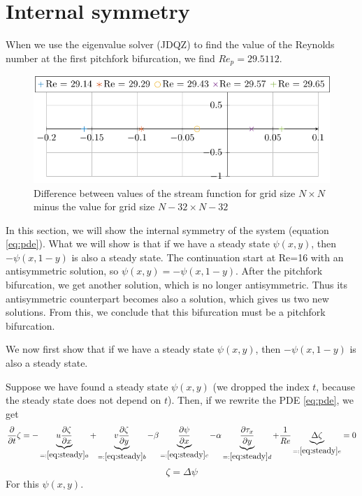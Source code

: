 \section{Internal symmetry}
When we use the eigenvalue solver (JDQZ) to find the value of the Reynolds number at the first pitchfork bifurcation, we find $Re_p=29.5112$. 

\begin{figure}
	\includegraphics[width=\textwidth]{images/eigenvalues.pdf}
	\caption{Difference between values of the stream function for grid size $N\times N$ minus the value for grid size $N-32 \times N-32$}
	\label{fig:eigenvaluespitch}
\end{figure}

In this section, we will show the internal symmetry of the system (equation \ref{eq:pde}). What we will show is that if we have a steady state $\psi(x,y)$, then $-\psi(x,1-y)$ is also a steady state. The continuation start at Re=16 with an antisymmetric solution, so $\psi(x,y)=-\psi(x,1-y)$. After the pitchfork bifurcation, we get another solution, which is no longer antisymmetric. Thus its antisymmetric counterpart becomes also a solution, which gives us two new solutions. From this, we conclude that this bifurcation must be a pitchfork bifurcation.
 
 We now first show that if we have a steady state $\psi(x,y)$, then $-\psi(x,1-y)$ is also a steady state.
 
Suppose we have found a steady state $\psi(x,y)$ (we dropped the index $t$, because the steady state does not depend on $t$). Then, if we rewrite the PDE \ref{eq:pde}, we get
 \begin{equation}
   \frac{\partial}{\partial t}\zeta= - \underbrace{   u \frac{\partial\zeta}{\partial x}}_{=:\ref{eq:steady} a} +\underbrace{  v \frac{\partial\zeta}{\partial y}}_{=:\ref{eq:steady}b} - \beta \underbrace{\frac{\partial \psi}{\partial x} }_{=:\ref{eq:steady}c} - \alpha\underbrace{ \frac{\partial \tau_x}{\partial y}}_{=:\ref{eq:steady} d} +\frac{1}{Re}  \underbrace{\Delta \zeta}_{=:\ref{eq:steady}e}=0\label{eq:steady}
\end{equation}
 $$\zeta=\Delta \psi $$
For this $\psi(x,y)$.

